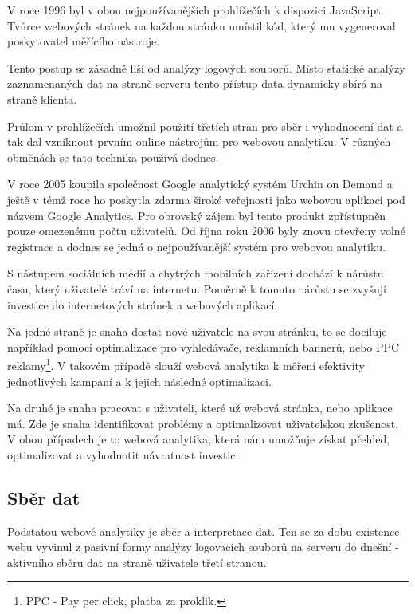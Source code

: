 \documentclass[bc,male,java,dept456]{diploma}						%
\begin{document}
V roce 1996 byl v obou nejpoužívanějších prohlížečích\cite{browser_market_share} k dispozici JavaScript. Tvůrce webových stránek na každou stránku umístil kód, který mu vygeneroval poskytovatel měřícího nástroje. 

Tento postup se zásadně liší od analýzy logových souborů. Místo statické analýzy zaznamenaných dat na straně serveru tento přístup data dynamicky sbírá na straně klienta.

Průlom v prohlížečích umožnil použití třetích stran pro sběr i vyhodnocení dat a tak dal vzniknout prvním online nástrojům pro webovou analytiku. V různých obměnách se tato technika používá dodnes.

V roce 2005 koupila\cite{urchin} společnost Google analytický systém Urchin on Demand a ještě v témž roce ho poskytla zdarma široké veřejnosti jako webovou aplikaci pod názvem Google Analytics. Pro obrovský zájem byl tento produkt zpřístupněn pouze omezenému počtu uživatelů. Od října roku 2006 byly znovu otevřeny volné registrace a dodnes se jedná o nejpoužívanější systém pro webovou analytiku.

S nástupem sociálních médií a chytrých mobilních zařízení dochází k nárůstu času, který uživatelé tráví na internetu. Poměrně k tomuto nárůstu se zvyšují investice do internetových stránek a webových aplikací. 

Na jedné straně je snaha dostat nové uživatele na svou stránku, to se dociluje na\-pří\-klad pomocí optimalizace pro vyhledávače, reklamních bannerů, nebo PPC reklamy\footnote{PPC - Pay per click, platba za proklik.}. V ta\-ko\-vém případě slouží webová analytika k měření efektivity jednotlivých kampaní a k jejich následné optimalizaci.

Na druhé je snaha pracovat s uživateli, které už webová stránka, nebo aplikace má. Zde je snaha identifikovat problémy a optimalizovat uživatelskou zkušenost. V obou případech je to webová analytika, která nám umožňuje získat přehled, optimalizovat a vyhodnotit návratnost investic.










\subsection{Sběr dat}

Podstatou webové analytiky je sběr a interpretace dat. Ten se za dobu existence webu vyvinul z pasivní formy analýzy logovacích souborů na serveru do dnešní - aktivního sběru dat na straně uživatele třetí stranou.
\end{document}
